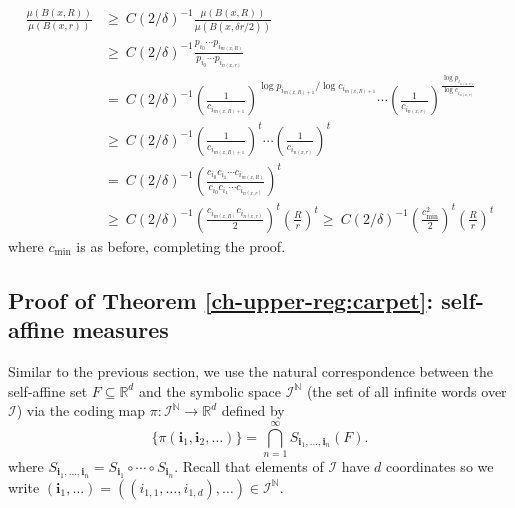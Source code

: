 \begin{align*}
\frac{\mu(B(x,R))}{\mu (B(x,r))}& \ge \ C(2/\delta)^{-1} \frac{\mu(B(x,R))}{\mu (B(x,\delta r/2))}  \\
& \ge \ C(2/\delta)^{-1} \frac{p_{i_0}\cdots p_{i_{m(x,R)}}}{p_{i_0}\cdots p_{i_{n(x,r)}}} \\
& = \ C(2/\delta)^{-1}  \left(\frac{1}{c_{i_{m(x,R)+1}}}\right)^{\log p_{i_{m(x,R)+1}}/\log c_{i_{m(x,R)+1}}} \cdots \left(\frac{1}{c_{i_{n(x,r)}}}\right)^{\frac{\log p_{i_{n(x,r)}}}{\log c_{i_{n(x,r)}}} } \\
& \ge\  C(2/\delta)^{-1}  \left( \frac{1}{c_{i_{m(x,R)+1}}}\right)^t \cdots \left( \frac{1}{c_{i_{n(x,r)}}}\right)^t \\
& = \ C(2/\delta)^{-1} \left( \frac{c_{i_0}c_{i_1} \cdots c_{i_{m(x,R)}}}{c_{i_0}c_{i_1} \cdots c_{i_{n(x,r)}}}\right)^t \\
& \ge \  C(2/\delta)^{-1} \left( \frac{c_{i_{m(x,R)}}c_{i_{n(x,r)}}}{2}  \right)^t  \left( \frac{R}{r}\right)^t \ge \  C(2/\delta)^{-1} \left( \frac{c_{\min}^2}{2}  \right)^t  \left( \frac{R}{r}\right)^t
\end{align*}
where $c_{\min}$ is as before, completing the proof.




\subsection{Proof of Theorem \ref{ch-upper-reg:carpet}: self-affine measures} \label{ch-upper-reg:self-affine}



Similar to the previous section, we use the natural correspondence between the self-affine set $F\subseteq \mathbb{R}^d$ and the symbolic space $\mathcal{I}^{\mathbb{N}}$ (the set of all infinite words over $\mathcal{I}$) via the coding map $\pi \colon \mathcal{I}^{\mathbb{N}} \rightarrow \mathbb{R}^d$ defined by 
\[
\{\pi(\textbf{i}_1, \textbf{i}_2, \ldots)\}=  \bigcap_{n=1}^\infty S_{\textbf{i}_1,\ldots, \textbf{i}_n}(F).
\]
where $ S_{\textbf{i}_1,\ldots, \textbf{i}_n} =  S_{\textbf{i}_1} \circ \cdots \circ S_{\textbf{i}_n}$.  Recall that elements of $\mathcal{I}$ have $d$ coordinates so we write $(\mathbf{i}_1,\ldots) = ((i_{1,1},\ldots, i_{1,d}),\ldots) \in \mathcal{I}^{\mathbb{N}} $.


